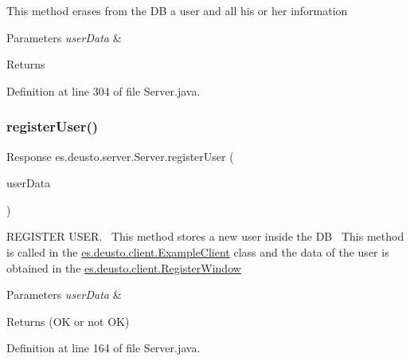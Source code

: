 This method erases from the DB a user and all his or her information 
\begin{DoxyParams}{Parameters}
{\em user\+Data} & \\
\hline
\end{DoxyParams}
\begin{DoxyReturn}{Returns}

\end{DoxyReturn}


Definition at line 304 of file Server.\+java.

\mbox{\label{classes_1_1deusto_1_1server_1_1_server_a12f56d7a970c3c41fefe8ed2db835c0a}} 
\subsubsection{\texorpdfstring{register\+User()}{registerUser()}}
{\footnotesize\ttfamily Response es.\+deusto.\+server.\+Server.\+register\+User (\begin{DoxyParamCaption}\item[{\hyperlink{classes_1_1deusto_1_1serialization_1_1_user_data}{User\+Data}}]{user\+Data }\end{DoxyParamCaption})}

R\+E\+G\+I\+S\+T\+ER U\+S\+ER.~\newline
This method stores a new user inside the DB~\newline
This method is called in the \hyperlink{classes_1_1deusto_1_1client_1_1_example_client}{es.\+deusto.\+client.\+Example\+Client} class and the data of the user is obtained in the \hyperlink{classes_1_1deusto_1_1client_1_1_register_window}{es.\+deusto.\+client.\+Register\+Window}~\newline

\begin{DoxyParams}{Parameters}
{\em user\+Data} & \\
\hline
\end{DoxyParams}
\begin{DoxyReturn}{Returns}
(OK or not OK) 
\end{DoxyReturn}


Definition at line 164 of file Server.\+java.

\mbox{\label{classes_1_1deusto_1_1server_1_1_server_aa28b04cc2643cf60072fc2a680288cde}} 
